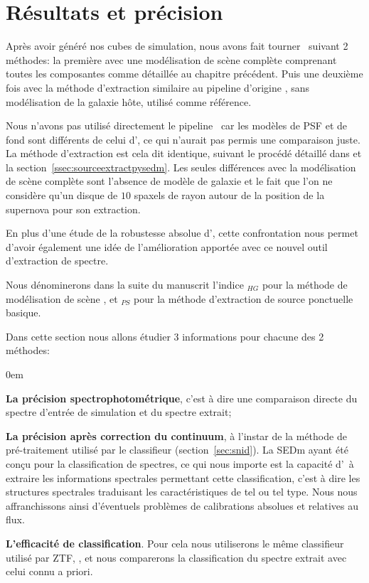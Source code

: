 \documentclass[../main/main.tex]{subfiles}
\begin{document}
\section{Résultats et précision}\label{sec:simuresult}

Après avoir généré nos cubes de simulation, nous avons fait tourner
\hypergal\ suivant 2 méthodes: la première avec une modélisation de
scène complète comprenant toutes les composantes comme détaillée au chapitre
précédent. Puis une deuxième fois avec la méthode d'extraction similaire au
pipeline d'origine \pysedm, sans modélisation de la galaxie hôte,
utilisé comme référence.

Nous n'avons pas utilisé directement le pipeline \pysedm\ car les modèles
de PSF et de fond sont différents de celui d'\hypergal, ce qui n'aurait
pas permis une comparaison juste. La méthode d'extraction est cela dit
identique, suivant le procédé détaillé dans \citet{pysedm} et la section~\ref{ssec:sourceextractpysedm}.
Les seules différences avec la modélisation de scène complète sont
l'absence de modèle de galaxie et le fait que l'on ne considère qu'un
disque de $10$ spaxels de rayon autour de la position de la supernova
pour son extraction.

En plus d'une étude de la robustesse absolue d'\hypergal, cette
confrontation nous permet d'avoir également une idée de l'amélioration
apportée avec ce nouvel outil d'extraction de spectre.

Nous dénominerons dans la suite du manuscrit l'indice $_{HG}$ pour la
méthode de modélisation de scène \hypergal, et $_{PS}$ pour la méthode
d'extraction de source ponctuelle basique.

Dans cette section nous allons étudier 3 informations pour chacune des 2
méthodes:

\begin{itemize}[label=$\diamondsuit$]
  \itemsep0em
 \begin{samepage}
\item \textbf{La précision spectrophotométrique}, c'est à dire une
  comparaison directe du spectre d'entrée de simulation et du spectre extrait;
\item \textbf{La précision après correction du continuum}, à l'instar de
  la méthode de pré-traitement utilisé par le classifieur 
  (section~\ref{sec:snid}). La SEDm ayant été conçu pour la
  classification de spectres, ce qui nous importe est la
  capacité d'\hypergal\ à extraire les informations spectrales
  permettant cette classification, c'est à dire les structures spectrales
  traduisant les caractéristiques de tel ou tel type. Nous nous
  affranchissons ainsi d'éventuels problèmes de calibrations absolues et
  relatives au flux.
\item \textbf{L'efficacité de classification}. Pour cela nous
  utiliserons le même classifieur utilisé par ZTF, , et nous
  comparerons la classification du spectre extrait avec celui connu a priori.
  \end{samepage}
\end{itemize}
\end{document}
